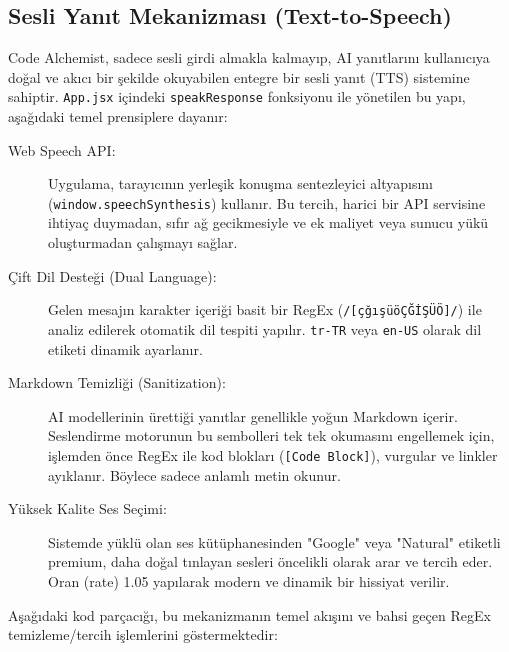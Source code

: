 \documentclass[12pt,a4paper]{article}
\begin{document}
\subsection{Sesli Yanıt Mekanizması (Text-to-Speech)}
\label{subsec:tts}

Code Alchemist, sadece sesli girdi almakla kalmayıp, AI yanıtlarını kullanıcıya doğal ve akıcı bir şekilde okuyabilen entegre bir sesli yanıt (TTS) sistemine sahiptir. \texttt{App.jsx} içindeki \texttt{speakResponse} fonksiyonu ile yönetilen bu yapı, aşağıdaki temel prensiplere dayanır:

\begin{description}
    \item[Web Speech API:] Uygulama, tarayıcının yerleşik konuşma sentezleyici altyapısını (\texttt{window.speechSynthesis}) kullanır. Bu tercih, harici bir API servisine ihtiyaç duymadan, sıfır ağ gecikmesiyle ve ek maliyet veya sunucu yükü oluşturmadan çalışmayı sağlar.
    
    \item[Çift Dil Desteği (Dual Language):] Gelen mesajın karakter içeriği basit bir RegEx (\texttt{/[çğışüöÇĞİŞÜÖ]/}) ile analiz edilerek otomatik dil tespiti yapılır. \texttt{tr-TR} veya \texttt{en-US} olarak dil etiketi dinamik ayarlanır.
    
    \item[Markdown Temizliği (Sanitization):] AI modellerinin ürettiği yanıtlar genellikle yoğun Markdown içerir. Seslendirme motorunun bu sembolleri tek tek okumasını engellemek için, işlemden önce RegEx ile kod blokları (\texttt{[Code Block]}), vurgular ve linkler ayıklanır. Böylece sadece anlamlı metin okunur.
    
    \item[Yüksek Kalite Ses Seçimi:] Sistemde yüklü olan ses kütüphanesinden "Google" veya "Natural" etiketli premium, daha doğal tınlayan sesleri öncelikli olarak arar ve tercih eder. Oran (rate) 1.05 yapılarak modern ve dinamik bir hissiyat verilir.
\end{description}

Aşağıdaki kod parçacığı, bu mekanizmanın temel akışını ve bahsi geçen RegEx temizleme/tercih işlemlerini göstermektedir:
\end{document}
